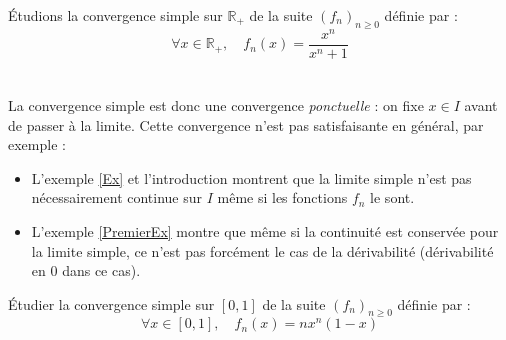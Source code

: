 \documentclass[a4paper,10pt]{report}
\begin{document}
\begin{ex}\label{Ex} Étudions la convergence simple  sur $\mathbb{R}_+$ de la suite $(f_n)_{n \geq 0}$ définie par :
$$ \forall x \in \mathbb{R}_+, \quad f_n(x) = \frac{x^n}{x^n+1}$$


\newpage
$\phantom{test}$
%
%
%
%

\vspace{8cm}

\end{ex}

\begin{rem} La convergence simple est donc une convergence \textit{ponctuelle} : on fixe $x \in I$ avant de passer à la limite. Cette convergence n'est pas satisfaisante en général, par exemple :

\begin{itemize}
\item L'exemple \ref{Ex} et l'introduction montrent que la limite simple n'est pas nécessairement continue sur $I$ même si les fonctions $f_n$ le sont.
\item L'exemple \ref{PremierEx} montre que même si la continuité est conservée pour la limite simple, ce n'est pas forcément le cas de la dérivabilité (dérivabilité en $0$ dans ce cas).
\end{itemize}
\end{rem}

\begin{exa} Étudier la convergence simple sur $[0,1]$ de la suite $(f_n)_{n \geq 0}$ définie par :
$$ \forall x \in [0,1], \quad f_n(x) = n x^n(1-x)$$
\end{exa}
\end{document}

